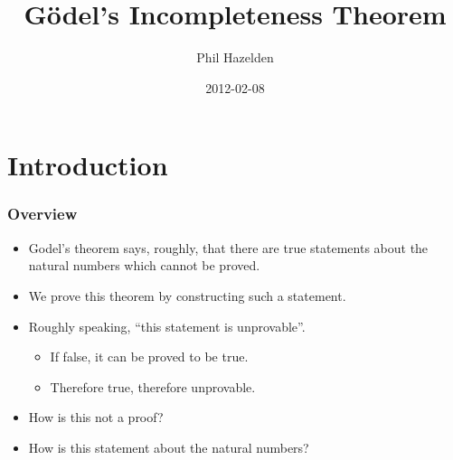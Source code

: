 \documentclass[mathserif]{beamer}
\title{Gödel's Incompleteness Theorem}
\author{Phil Hazelden}
\date{2012-02-08}
\begin{document}
\maketitle



\section{Introduction}
\label{sec-1}
\begin{frame}
\frametitle{Overview}
\label{sec-1-1}

\pause
\begin{itemize}

\item Godel's theorem says, roughly, that there are true statements about the natural numbers which cannot be proved.\pause\\
\label{sec-1-1-1}%
\item We prove this theorem by constructing such a statement.\pause\\
\label{sec-1-1-2}%
\item Roughly speaking, ``this statement is unprovable''.\pause
\label{sec-1-1-3}%
\begin{itemize}

\item If false, it can be proved to be true.\pause\\
\label{sec-1-1-3-1}%
\item Therefore true, therefore unprovable.\pause\\
\label{sec-1-1-3-2}%
\end{itemize} %

\item How is this not a proof?\pause\\
\label{sec-1-1-4}%
\item How is this statement about the natural numbers?\\
\label{sec-1-1-5}%
\end{itemize} %
\end{frame}
\end{document}
